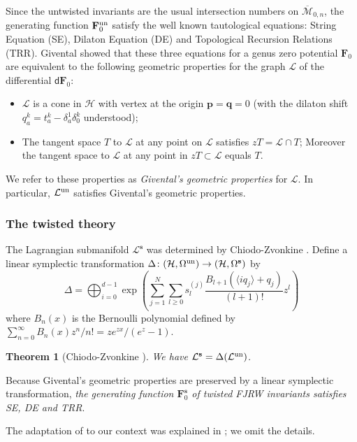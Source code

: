 \documentclass[11pt]{amsart}
\newtheorem{thm}{Theorem}[section] %
\theoremstyle{definition} %
\theoremstyle{remark} %
\newcommand{\un}{{\rm un}}
\def\nn{N}
\def\ol{\overline}
\newcommand{\bs}{\mathbf{s}}
\newcommand{\bp}{\mathbf{p}}
\newcommand{\bq}{\mathbf{q}}
\newcommand{\bF}{\mathbf{F}}
\newcommand{\cL}{\mathcal{L}}
\newcommand{\cH}{\mathcal{H}}
\newcommand{\dd}{\mathsf{d}}
\begin{document}
Since the untwisted invariants are 
the usual intersection numbers on $\ol {\mathcal M}_{0,n}$, 
the generating function 
$\bF^\un_0$ satisfy the well known tautological equations:  
String Equation (SE), Dilaton Equation (DE) and 
Topological Recursion Relations (TRR). 
Givental \cite{Givental} showed that 
these three equations for a genus zero 
potential $\bF_0$ are equivalent to the following 
geometric properties for 
the graph $\cL$ of the differential $\dd\bF_0$: 
\begin{itemize} 
\item $\cL$ is a cone in $\cH$ with 
vertex at the origin $\bp=\bq=0$ 
(with the dilaton shift $q^k_a=t^k_a- \delta_a^1 \delta^k_0$ understood); 

\item 
The tangent space $T$ to $\cL$ at any point on $\cL$ 
satisfies $zT=\cL \cap T$; Moreover 
the tangent space to $\cL$ at any point in $zT\subset \cL$ equals $T$. 
\end{itemize} 
We refer to these properties as \emph{Givental's geometric 
properties} for $\cL$. 
In particular, $\cL^\un$ satisfies Givental's geometric properties. 

\subsubsection{The twisted theory} 
\label{subsubsec:twistedtheory}
The Lagrangian submanifold $\cL^\bs$ was 
determined by Chiodo-Zvonkine \cite{CZ}. 
Define a linear symplectic transformation 
$\Delta \colon (\cH,\Omega^\un) \to (\cH,\Omega^\bs)$ by 
\begin{equation}
\label{eq:transf}
\Delta=\bigoplus_{i=0}^{d-1} \exp \left(\sum_{j=1}^\nn\sum_{l\ge 0}
s^{(j)}_l \frac{B_{l+1}\left(\langle iq_j\rangle+q_j \right)}
{(l+1)!}z^l \right)
\end{equation} 
where $B_n(x)$ is the Bernoulli polynomial defined 
by $\sum_{n=0}^\infty B_n(x) z^n/n! = z e^{zx}/(e^z-1)$. 
\begin{thm}[Chiodo-Zvonkine \cite{CZ}]  
\label{thm:symplectictrans}
We have $\cL^\bs = \Delta (\cL^\un)$. 
\end{thm} 
Because Givental's geometric properties are preserved 
by a linear symplectic transformation, 
\emph{the generating function $\bF^\bs_0$ of twisted FJRW invariants 
satisfies SE, DE and TRR}. 

The adaptation of \cite{CZ} to our context was  
explained in \cite[Proposition 4.1.5]{ChiRquintic}; 
we omit the details. 
\end{document}
